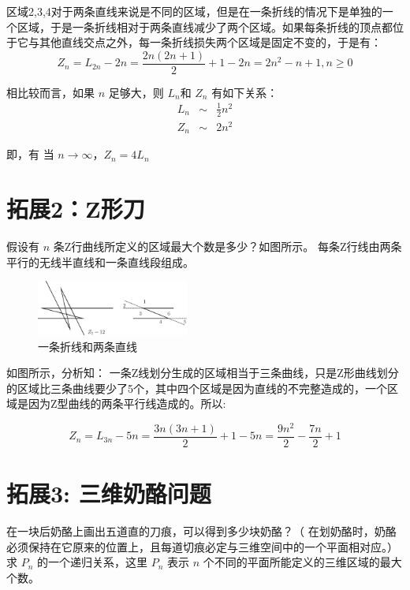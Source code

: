 \documentclass[10pt,a4paper,UTF8]{article}
\begin{document}
区域2,3,4对于两条直线来说是不同的区域，但是在一条折线的情况下是单独的一个区域，于是一条折线相对于两条直线减少了两个区域。如果每条折线的顶点都位于它与其他直线交点之外，每一条折线损失两个区域是固定不变的，于是有：
\begin{equation}
\label{eq:5}
Z_{n} = L_{2n} -2n = \frac{2n(2n+1)}{2} +1 -2n = 2n^{2} -n +1, n\ge 0
\end{equation}

相比较而言，如果 \(n\) 足够大，则 \(L_{n}\)和 \(Z_{n}\) 有如下关系：
\begin{eqnarray}
\label{eq:6}
L_{n} &\sim & \frac{1}{2}n^{2} \\
Z_{n} &\sim & 2n^{2}
\end{eqnarray}

即，有 当 \(n \rightarrow \infty\)，\(Z_{n} = 4 L_{n}\)
\section{拓展2：Z形刀}
\label{sec:orgheadline5}


假设有 \(n\) 条Z行曲线所定义的区域最大个数是多少？如图所示。 每条Z行线由两条平行的无线半直线和一条直线段组成。

\begin{figure}[htb]
\centering
\includegraphics[width=5cm]{../../img/pissazz.jpg}
\caption{一条折线和两条直线}
\end{figure}

如图所示，分析知： 一条Z线划分生成的区域相当于三条曲线，只是Z形曲线划分的区域比三条曲线要少了5个，其中四个区域是因为直线的不完整造成的，一个区域是因为Z型曲线的两条平行线造成的。所以:

\begin{equation*}
Z_{n} = L_{3n} - 5n = \frac{3n(3n+1)}{2} + 1 - 5n =  \frac{9n^{2}}{2} - \frac{7n}{2} +1
\end{equation*}

\section{拓展3: 三维奶酪问题}
\label{sec:orgheadline6}


在一块后奶酪上画出五道直的刀痕，可以得到多少块奶酪？（ 在划奶酪时，奶酪必须保持在它原来的位置上，且每道切痕必定与三维空间中的一个平面相对应。） 求 \(P_{n}\) 的一个递归关系，这里 \(P_{n}\) 表示 \(n\) 个不同的平面所能定义的三维区域的最大个数。
\end{document}
